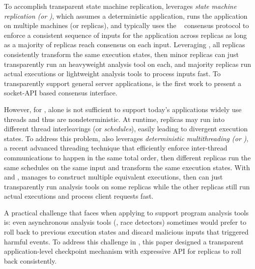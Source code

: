 To accomplish transparent state machine replication, \repbox leverages 
\emph{state machine replication (or \smr)}, which assumes a deterministic 
application, runs the application on multiple machines (or replicas), and 
typically uses the \paxos~\cite{paxos} consensus protocol to enforce a 
consistent sequence of inputs for the application across replicas as long as a 
majority of replicas reach consensus on each input. Leveraging \smr, all 
replicas consistently transform the same execution states, then minor replicas 
can just transparently run an heavyweight analysis tool on each, and majority 
replicas run actual executions or lightweight analysis tools to process inputs 
fast. To transparently support general server applications, \repbox is the 
first work to present a socket-API based \paxos consensus interface.


However, for \repbox, \smr alone is not sufficient to support today's 
applications widely use threads and thus are nondeterministic. At runtime, 
replicas may run into different thread interleavings (or \emph{schedules}), 
easily leading to divergent execution states. To address this problem, \repbox 
also leverages \emph{deterministic multithreading (or \dmt)}, a recent advanced 
threading technique that efficiently enforce inter-thread communications to 
happen in the same total order, then different replicas run the same schedules 
on the same input and transform the same execution states. With \smr and \dmt, 
\repbox manages to construct multiple equivalent executions, then \xxx can just 
transparently run analysis tools on some replicas while the other replicas 
still run actual executions and process client requests fast.


A practical challenge that faces \xxx when applying \repbox to support program 
analysis tools is: even asynchronous analysis tools (\eg, race detectors) 
sometimes would prefer to roll back to previous execution states and discard 
malicious inputs that triggered harmful events. To address this challenge in 
\xxx, this paper designed a transparent application-level checkpoint mechanism 
with expressive API for replicas to roll back consistently.



